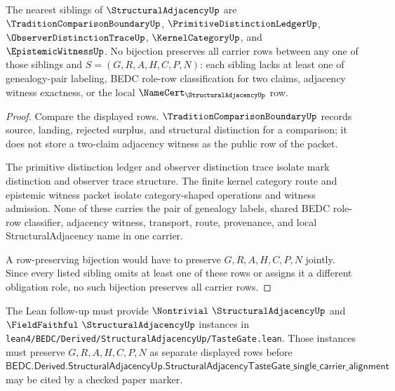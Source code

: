 \begin{theorem}
\label{thm:structural-adjacency-independence-witness}
The nearest siblings of $\StructuralAdjacencyUp$ are $\TraditionComparisonBoundaryUp$, $\PrimitiveDistinctionLedgerUp$, $\ObserverDistinctionTraceUp$, $\KernelCategoryUp$, and $\EpistemicWitnessUp$. No bijection preserves all carrier rows between any one of those siblings and $S=(G,R,A,H,C,P,N)$: each sibling lacks at least one of genealogy-pair labeling, BEDC role-row classification for two claims, adjacency witness exactness, or the local $\NameCert_{\StructuralAdjacencyUp}$ row.
\end{theorem}
\begin{proof}
Compare the displayed rows. $\TraditionComparisonBoundaryUp$ records source, landing, rejected surplus, and structural distinction for a comparison; it does not store a two-claim adjacency witness as the public row of the packet.

The primitive distinction ledger and observer distinction trace isolate mark distinction and observer trace structure. The finite kernel category route and epistemic witness packet isolate category-shaped operations and witness admission. None of these carries the pair of genealogy labels, shared BEDC role-row classifier, adjacency witness, transport, route, provenance, and local StructuralAdjacency name in one carrier.

A row-preserving bijection would have to preserve $G,R,A,H,C,P,N$ jointly. Since every listed sibling omits at least one of these rows or assigns it a different obligation role, no such bijection preserves all carrier rows.
\end{proof}



The Lean follow-up must provide $\Nontrivial\ \StructuralAdjacencyUp$ and $\FieldFaithful\ \StructuralAdjacencyUp$ instances in \texttt{lean4/BEDC/Derived/StructuralAdjacencyUp/TasteGate.lean}. Those instances must preserve $G,R,A,H,C,P,N$ as separate displayed rows before $\mathsf{BEDC.Derived.StructuralAdjacencyUp.StructuralAdjacencyTasteGate\_single\_carrier\_alignment}$ may be cited by a checked paper marker.

